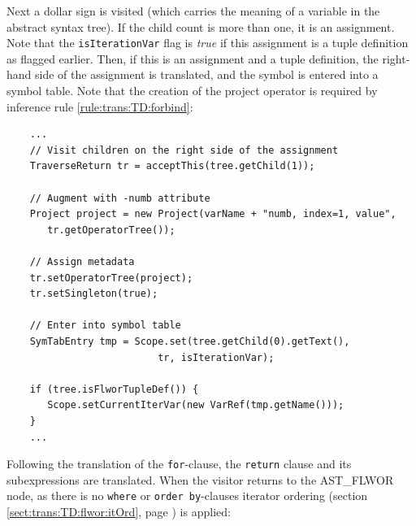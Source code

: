 Next a dollar sign is visited (which carries the meaning of a variable in the
abstract syntax tree). If the child count is more than one, it is an
assignment. Note that the \texttt{isIterationVar} flag is \textit{true} if
this assignment is a tuple definition as flagged earlier. Then, if this is an
assignment and a tuple definition, the right-hand side of the assignment is
translated, and the symbol is entered into a symbol table. Note that the
creation of the project operator is required by inference rule
\ref{rule:trans:TD:forbind}:

\begin{Verbatim}
    ...      
    // Visit children on the right side of the assignment
    TraverseReturn tr = acceptThis(tree.getChild(1));
        
    // Augment with -numb attribute
    Project project = new Project(varName + "numb, index=1, value", 
       tr.getOperatorTree());

    // Assign metadata
    tr.setOperatorTree(project);
    tr.setSingleton(true);
     
    // Enter into symbol table
    SymTabEntry tmp = Scope.set(tree.getChild(0).getText(), 
                          tr, isIterationVar);
     
    if (tree.isFlworTupleDef()) {
       Scope.setCurrentIterVar(new VarRef(tmp.getName()));
    }
    ...    
\end{Verbatim}



Following the translation of the \texttt{for}-clause, the \texttt{return} clause and its subexpressions are
translated. When the visitor returns to the AST\_FLWOR node, as there is no \texttt{where} or \texttt{order
by}-clauses iterator ordering (section \ref{sect:trans:TD:flwor:itOrd}, page \pageref{sect:trans:TD:flwor:itOrd})
is applied:

